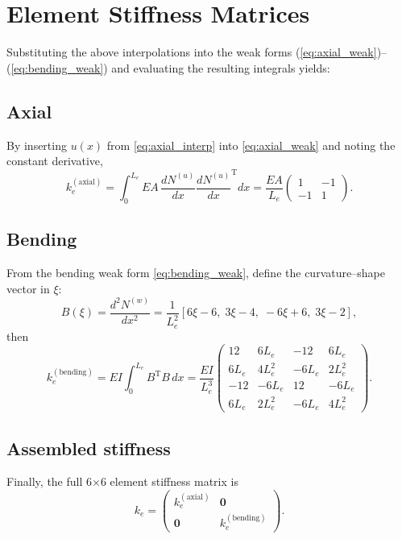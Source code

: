 \documentclass{article}
\begin{document}
	\section{Element Stiffness Matrices}
	Substituting the above interpolations into the weak forms (\ref{eq:axial_weak})–(\ref{eq:bending_weak}) and evaluating the resulting integrals yields:
	
	\subsection{Axial}
	By inserting \(u(x)\) from \eqref{eq:axial_interp} into \eqref{eq:axial_weak} and noting the constant derivative,
	\begin{equation}\label{eq:ke_axial}
		k_e^{(\mathrm{axial})}
		= \int_0^{L_e}EA\,\frac{dN^{(u)}}{dx}\frac{dN^{(u)}}{dx}^\text{T}dx
		= \frac{EA}{L_e}
		\begin{pmatrix}1 & -1\\ -1 & 1\end{pmatrix}.
	\end{equation}


	\subsection{Bending}
	From the bending weak form \eqref{eq:bending_weak}, define the curvature–shape vector in \(\xi\):
	\begin{equation}\label{eq:B_vector}
		B(\xi)
		= \frac{d^2N^{(w)}}{dx^2}
		= \frac{1}{L_e^2}[6\xi-6,\;3\xi-4,\;-6\xi+6,\;3\xi-2],
	\end{equation}
	then
	\begin{equation}\label{eq:ke_bending}
		k_e^{(\mathrm{bending})}
		= EI\int_0^{L_e}B^\text{T} B\,dx
		= \frac{EI}{L_e^3}
		\begin{pmatrix}
			12 & 6L_e & -12 & 6L_e\\
			6L_e & 4L_e^2 & -6L_e & 2L_e^2\\
			-12 & -6L_e & 12 & -6L_e\\
			6L_e & 2L_e^2 & -6L_e & 4L_e^2
		\end{pmatrix}.
	\end{equation}
	
	\subsection{Assembled stiffness}
	Finally, the full 6×6 element stiffness matrix is
	\begin{equation}\label{eq:ke_assembled}
		k_e
		= \begin{pmatrix}
			k_e^{(\mathrm{axial})} & \mathbf{0}\\
			\mathbf{0}            & k_e^{(\mathrm{bending})}
		\end{pmatrix}.
	\end{equation}
	
\end{document}
